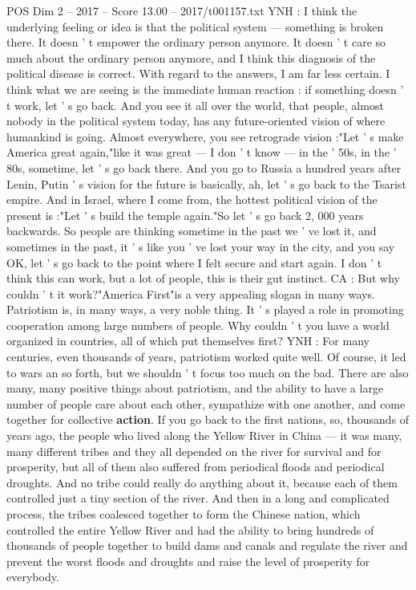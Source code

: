 \begin{textsample}{POS Dim 2 – 2017 – Score 13.00 – 2017/t001157.txt}
YNH : I think the underlying feeling or idea is that the political system — something is broken there.
It doesn ' t empower the ordinary person anymore.
It doesn ' t care so much about the ordinary person anymore, and I think this diagnosis of the political disease is correct.
With regard to the answers, I am far less certain.
I think what we are seeing is the immediate human reaction : if something doesn ' t work, let ' s go back.
And you see it all over the world, that people, almost nobody in the political system today, has any future-oriented vision of where humankind is going.
Almost everywhere, you see retrograde vision :"Let ' s make America great again,"like it was great — I don ' t know — in the ' 50s, in the ' 80s, sometime, let ' s go back there.
And you go to Russia a hundred years after Lenin, Putin ' s vision for the future is basically, ah, let ' s go back to the Tsarist empire.
And in Israel, where I come from, the hottest political vision of the present is :"Let ' s build the temple again."So let ' s go back 2, 000 years backwards.
So people are thinking sometime in the past we ' ve lost it, and sometimes in the past, it ' s like you ' ve lost your way in the city, and you say OK, let ' s go back to the point where I felt secure and start again.
I don ' t think this can work, but a lot of people, this is their gut instinct.
CA : But why couldn ' t it work?"America First"is a very appealing slogan in many ways.
Patriotism is, in many ways, a very noble thing.
It ' s played a role in promoting cooperation among large numbers of people.
Why couldn ' t you have a world organized in countries, all of which put themselves first?
YNH : For many centuries, even thousands of years, patriotism worked quite well.
Of course, it led to wars an so forth, but we shouldn ' t focus too much on the bad.
There are also many, many positive things about patriotism, and the ability to have a large number of people care about each other, sympathize with one another, and come together for collective \textbf{action}.
If you go back to the first nations, so, thousands of years ago, the people who lived along the Yellow River in China — it was many, many different tribes and they all depended on the river for survival and for prosperity, but all of them also suffered from periodical floods and periodical droughts.
And no tribe could really do anything about it, because each of them controlled just a tiny section of the river.
And then in a long and complicated process, the tribes coalesced together to form the Chinese nation, which controlled the entire Yellow River and had the ability to bring hundreds of thousands of people together to build dams and canals and regulate the river and prevent the worst floods and droughts and raise the level of prosperity for everybody.

\end{textsample}
